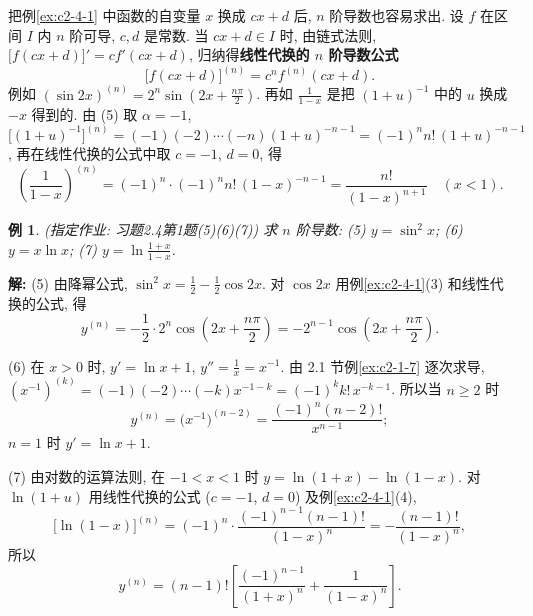 \documentclass[UTF8,openany]{ctexbook}
\theoremstyle{chinesetextbook}
\newtheorem{example}{例}[section]
\newenvironment{cnsolution}{\par\indent\textbf{解:} \ignorespaces}{\par}
\begin{document}
把例\ref{ex:c2-4-1} 中函数的自变量 $x$ 换成 $cx+d$ 后, $n$ 阶导数也容易求出. 设 $f$ 在区间 $I$ 内 $n$ 阶可导, $c,d$ 是常数. 当 $cx+d\in I$ 时, 由链式法则, $\bigl[f(cx+d)\bigr]'=cf'(cx+d)$, 归纳得\textbf{线性代换的 $n$ 阶导数公式}
\[
\bigl[f(cx+d)\bigr]^{(n)}=c^nf^{(n)}(cx+d).
\]
例如 $\displaystyle(\sin2x)^{(n)}=2^n\sin\left(2x+\frac{n\pi}2\right)$. 再如 $\displaystyle\frac1{1-x}$ 是把 $(1+u)^{-1}$ 中的 $u$ 换成 $-x$ 得到的. 由 (5) 取 $\alpha=-1$, $\bigl[(1+u)^{-1}\bigr]^{(n)}=(-1)(-2)\cdots(-n)(1+u)^{-n-1}=(-1)^nn!\,(1+u)^{-n-1}$, 再在线性代换的公式中取 $c=-1$, $d=0$, 得
\[
\left(\frac1{1-x}\right)^{(n)}=(-1)^n\cdot(-1)^nn!\,(1-x)^{-n-1}=\frac{n!}{(1-x)^{n+1}}\quad(x<1).
\]
\begin{example}\label{ex:c2-h4-1}
\textnormal{(指定作业: 习题2.4第1题(5)(6)(7))} 求 $n$ 阶导数: (5) $y=\sin^2x$; (6) $y=x\ln x$; (7) $\displaystyle y=\ln\frac{1+x}{1-x}$.
\end{example}
\begin{cnsolution}
(5) 由降幂公式, $\displaystyle\sin^2x=\frac12-\frac12\cos2x$. 对 $\cos2x$ 用例\ref{ex:c2-4-1}(3) 和线性代换的公式, 得
\[
y^{(n)}=-\frac12\cdot2^n\cos\left(2x+\frac{n\pi}2\right)=-2^{n-1}\cos\left(2x+\frac{n\pi}2\right).
\]

(6) 在 $x>0$ 时, $y'=\ln x+1$, $\displaystyle y''=\frac1x=x^{-1}$. 由 2.1 节例\ref{ex:c2-1-7} 逐次求导, $(x^{-1})^{(k)}=(-1)(-2)\cdots(-k)x^{-1-k}=(-1)^kk!\,x^{-k-1}$. 所以当 $n\ge2$ 时
\[
y^{(n)}=\bigl(x^{-1}\bigr)^{(n-2)}=\frac{(-1)^n(n-2)!}{x^{n-1}};
\]
$n=1$ 时 $y'=\ln x+1$.

(7) 由对数的运算法则, 在 $-1<x<1$ 时 $y=\ln(1+x)-\ln(1-x)$. 对 $\ln(1+u)$ 用线性代换的公式 ($c=-1$, $d=0$) 及例\ref{ex:c2-4-1}(4),
\[
\bigl[\ln(1-x)\bigr]^{(n)}=(-1)^n\cdot\frac{(-1)^{n-1}(n-1)!}{(1-x)^n}=-\frac{(n-1)!}{(1-x)^n},
\]
所以
\[
y^{(n)}=(n-1)!\left[\frac{(-1)^{n-1}}{(1+x)^n}+\frac1{(1-x)^n}\right].
\]
\end{cnsolution}
\end{document}
